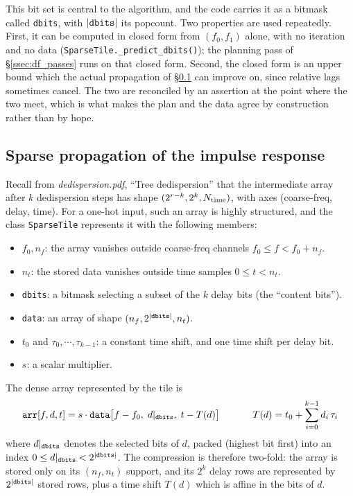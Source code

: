 \documentclass{article}
\numberwithin{equation}{section}   %
\newcommand{\ddnotes}[1]{{\em dedispersion.pdf}, ``#1''}
\begin{document}
This bit set is central to the algorithm, and the code carries it as a bitmask called
{\tt dbits}, with $|{\tt dbits}|$ its popcount. Two properties are used repeatedly. First, it can
be computed in closed form from $(f_0, f_1)$ alone, with no iteration and no data
(\verb|SparseTile._predict_dbits()|); the planning pass of \S\ref{ssec:df_passes} runs on that
closed form. Second, the closed form is an upper bound which the actual propagation of
\S\ref{sec:avar_sparsetile} can improve on, since relative lags sometimes cancel. The two are
reconciled by an assertion at the point where the two meet, which is what makes the plan and the
data agree by construction rather than by hope.

\subsection{Sparse propagation of the impulse response}
\label{sec:avar_sparsetile}

Recall from \ddnotes{Tree dedispersion} that the intermediate array after $k$ dedispersion steps
has shape $(2^{r-k}, 2^k, N_{\rm time})$, with axes (coarse-freq, delay, time). For a one-hot
input, such an array is highly structured, and the class \verb|SparseTile| represents it with the
following members:
\begin{itemize}
\item $f_0, n_f$: the array vanishes outside coarse-freq channels $f_0 \le f < f_0 + n_f$.
\item $n_t$: the stored data vanishes outside time samples $0 \le t < n_t$.
\item {\tt dbits}: a bitmask selecting a subset of the $k$ delay bits (the ``content bits'').
\item {\tt data}: an array of shape $(n_f, 2^{|{\tt dbits}|}, n_t)$.
\item $t_0$ and $\tau_0, \cdots, \tau_{k-1}$: a constant time shift, and one time shift per delay bit.
\item $s$: a scalar multiplier.
\end{itemize}
The dense array represented by the tile is
\begin{equation}
{\tt arr}[f,d,t] = s \cdot {\tt data}\big[ f - f_0, \; d|_{\tt dbits}, \; t - T(d) \big]
  \hspace{1.2cm}
T(d) = t_0 + \sum_{i=0}^{k-1} d_i \, \tau_i
  \label{eq:avar_tile}
\end{equation}
where $d|_{\tt dbits}$ denotes the selected bits of $d$, packed (highest bit first) into an index
$0 \le d|_{\tt dbits} < 2^{|{\tt dbits}|}$.
The compression is therefore two-fold: the array is stored only on its $(n_f, n_t)$ support, and
its $2^k$ delay rows are represented by $2^{|{\tt dbits}|}$ stored rows, plus a time shift $T(d)$
which is affine in the bits of $d$.
\end{document}
